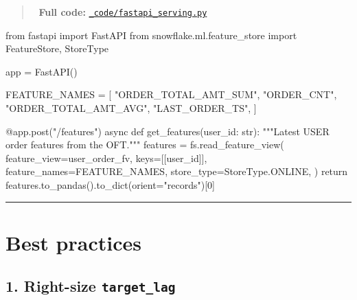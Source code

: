 \documentclass[
  letterpaper,
  DIV=11,
  numbers=noendperiod]{scrreprt}
\newenvironment{Shaded}{\begin{snugshade}}{\end{snugshade}}
\newcommand{\AttributeTok}[1]{\textcolor[rgb]{0.40,0.45,0.13}{#1}}
\newcommand{\BuiltInTok}[1]{\textcolor[rgb]{0.00,0.23,0.31}{#1}}
\newcommand{\CommentTok}[1]{\textcolor[rgb]{0.37,0.37,0.37}{#1}}
\newcommand{\ControlFlowTok}[1]{\textcolor[rgb]{0.00,0.23,0.31}{#1}}
\newcommand{\DecValTok}[1]{\textcolor[rgb]{0.68,0.00,0.00}{#1}}
\newcommand{\ImportTok}[1]{\textcolor[rgb]{0.00,0.46,0.62}{#1}}
\newcommand{\KeywordTok}[1]{\textcolor[rgb]{0.00,0.23,0.31}{#1}}
\newcommand{\NormalTok}[1]{\textcolor[rgb]{0.00,0.23,0.31}{#1}}
\newcommand{\OperatorTok}[1]{\textcolor[rgb]{0.37,0.37,0.37}{#1}}
\newcommand{\StringTok}[1]{\textcolor[rgb]{0.13,0.47,0.30}{#1}}
\begin{document}
\begin{quote}
📁 \textbf{Full code:}
\href{_code/fastapi_serving.py}{\texttt{\_code/fastapi\_serving.py}}
\end{quote}

\begin{Shaded}
\begin{Highlighting}[]
\ImportTok{from}\NormalTok{ fastapi }\ImportTok{import}\NormalTok{ FastAPI}
\ImportTok{from}\NormalTok{ snowflake.ml.feature\_store }\ImportTok{import}\NormalTok{ FeatureStore, StoreType}

\NormalTok{app }\OperatorTok{=}\NormalTok{ FastAPI()}

\NormalTok{FEATURE\_NAMES }\OperatorTok{=}\NormalTok{ [}
    \StringTok{"ORDER\_TOTAL\_AMT\_SUM"}\NormalTok{,}
    \StringTok{"ORDER\_CNT"}\NormalTok{,}
    \StringTok{"ORDER\_TOTAL\_AMT\_AVG"}\NormalTok{,}
    \StringTok{"LAST\_ORDER\_TS"}\NormalTok{,}
\NormalTok{]}

\AttributeTok{@app.post}\NormalTok{(}\StringTok{"/features"}\NormalTok{)}
\ControlFlowTok{async} \KeywordTok{def}\NormalTok{ get\_features(user\_id: }\BuiltInTok{str}\NormalTok{):}
    \CommentTok{"""Latest USER order features from the OFT."""}
\NormalTok{    features }\OperatorTok{=}\NormalTok{ fs.read\_feature\_view(}
\NormalTok{        feature\_view}\OperatorTok{=}\NormalTok{user\_order\_fv,}
\NormalTok{        keys}\OperatorTok{=}\NormalTok{[[user\_id]],}
\NormalTok{        feature\_names}\OperatorTok{=}\NormalTok{FEATURE\_NAMES,}
\NormalTok{        store\_type}\OperatorTok{=}\NormalTok{StoreType.ONLINE,}
\NormalTok{    )}
    \ControlFlowTok{return}\NormalTok{ features.to\_pandas().to\_dict(orient}\OperatorTok{=}\StringTok{"records"}\NormalTok{)[}\DecValTok{0}\NormalTok{]}
\end{Highlighting}
\end{Shaded}

\begin{center}\rule{0.5\linewidth}{0.5pt}\end{center}

\hypertarget{best-practices-6}{%
\section{Best practices}\label{best-practices-6}}

\hypertarget{right-size-target_lag}{%
\subsection{\texorpdfstring{1. Right-size
\texttt{target\_lag}}{1. Right-size target\_lag}}\label{right-size-target_lag}}
\end{document}
